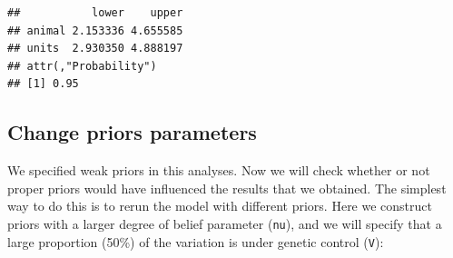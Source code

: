 \documentclass[
  12pt,
]{book}
\newenvironment{Shaded}{\begin{snugshade}}{\end{snugshade}}
\newcommand{\AttributeTok}[1]{\textcolor[rgb]{0.77,0.63,0.00}{#1}}
\newcommand{\ConstantTok}[1]{\textcolor[rgb]{0.00,0.00,0.00}{#1}}
\newcommand{\DecValTok}[1]{\textcolor[rgb]{0.00,0.00,0.81}{#1}}
\newcommand{\FloatTok}[1]{\textcolor[rgb]{0.00,0.00,0.81}{#1}}
\newcommand{\FunctionTok}[1]{\textcolor[rgb]{0.00,0.00,0.00}{#1}}
\newcommand{\NormalTok}[1]{#1}
\newcommand{\OtherTok}[1]{\textcolor[rgb]{0.56,0.35,0.01}{#1}}
\newcommand{\SpecialCharTok}[1]{\textcolor[rgb]{0.00,0.00,0.00}{#1}}
\begin{document}
\begin{verbatim}
##           lower    upper
## animal 2.153336 4.655585
## units  2.930350 4.888197
## attr(,"Probability")
## [1] 0.95
\end{verbatim}

\hypertarget{change-priors-parameters}{%
\subsection{Change priors parameters}\label{change-priors-parameters}}

We specified weak priors in this analyses. Now we will check whether or not proper priors would have influenced the results that we obtained. The simplest way to do this is to rerun the model with different priors. Here we construct priors with a larger degree of belief parameter (\texttt{nu}), and we will specify that a large proportion (50\%) of the variation is under genetic control (\texttt{V}):

\begin{Shaded}
\end{Shaded}
\end{document}
